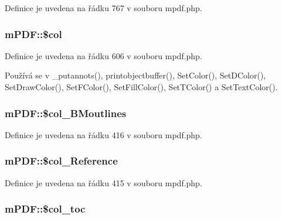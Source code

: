 Definice je uvedena na řádku 767 v souboru mpdf.\-php.

\hypertarget{classm_p_d_f_aacbd3e3839def6dcbb8dccf0989c1989}{
\subsubsection[{\$col}]{\setlength{\rightskip}{0pt plus 5cm}m\-P\-D\-F\-::\$col}}\label{classm_p_d_f_aacbd3e3839def6dcbb8dccf0989c1989}


Definice je uvedena na řádku 606 v souboru mpdf.\-php.



Používá se v \-\_\-putannots(), printobjectbuffer(), Set\-Color(), Set\-D\-Color(), Set\-Draw\-Color(), Set\-F\-Color(), Set\-Fill\-Color(), Set\-T\-Color() a Set\-Text\-Color().

\hypertarget{classm_p_d_f_a708a9e1f841baab8c877d74b81e3d6c9}{
\subsubsection[{\$col\-\_\-\-B\-Moutlines}]{\setlength{\rightskip}{0pt plus 5cm}m\-P\-D\-F\-::\$col\-\_\-\-B\-Moutlines}}\label{classm_p_d_f_a708a9e1f841baab8c877d74b81e3d6c9}


Definice je uvedena na řádku 416 v souboru mpdf.\-php.

\hypertarget{classm_p_d_f_af2a34060d4176afc993afa177ee48c0c}{
\subsubsection[{\$col\-\_\-\-Reference}]{\setlength{\rightskip}{0pt plus 5cm}m\-P\-D\-F\-::\$col\-\_\-\-Reference}}\label{classm_p_d_f_af2a34060d4176afc993afa177ee48c0c}


Definice je uvedena na řádku 415 v souboru mpdf.\-php.

\hypertarget{classm_p_d_f_a50b0936fccbc37260fe1366275aa6049}{
\subsubsection[{\$col\-\_\-toc}]{\setlength{\rightskip}{0pt plus 5cm}m\-P\-D\-F\-::\$col\-\_\-toc}}\label{classm_p_d_f_a50b0936fccbc37260fe1366275aa6049}


